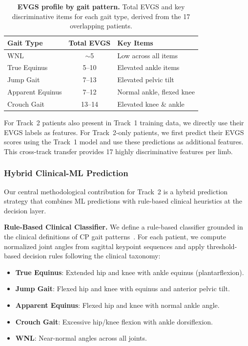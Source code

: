 \begin{table}[t]
    \centering
    \small
    \caption{\textbf{EVGS profile by gait pattern.} Total EVGS and key discriminative items for each gait type, derived from the 17 overlapping patients.}
    \label{tab:evgs_gait}
    \begin{tabular}{lcl}
        \toprule
        Gait Type & Total EVGS & Key Items \\
        \midrule
        WNL & $\sim$5 & Low across all items \\
        True Equinus & 5--10 & Elevated ankle items \\
        Jump Gait & 7--13 & Elevated pelvic tilt \\
        Apparent Equinus & 7--12 & Normal ankle, flexed knee \\
        Crouch Gait & 13--14 & Elevated knee \& ankle \\
        \bottomrule
    \end{tabular}
\end{table}

For Track~2 patients also present in Track~1 training data, we directly use their EVGS labels as features. For Track~2-only patients, we first predict their EVGS scores using the Track~1 model and use these predictions as additional features. This cross-track transfer provides 17 highly discriminative features per limb.

\subsubsection{Hybrid Clinical-ML Prediction}
\label{sec:hybrid}

Our central methodological contribution for Track~2 is a hybrid prediction strategy that combines ML predictions with rule-based clinical heuristics at the decision layer.

\noindent\textbf{Rule-Based Clinical Classifier.}
We define a rule-based classifier grounded in the clinical definitions of CP gait patterns~\cite{rodda2004classification}. For each patient, we compute normalized joint angles from sagittal keypoint sequences and apply threshold-based decision rules following the clinical taxonomy:
\begin{itemize}[leftmargin=*,nosep]
    \item \textbf{True Equinus}: Extended hip and knee with ankle equinus (plantarflexion).
    \item \textbf{Jump Gait}: Flexed hip and knee with equinus and anterior pelvic tilt.
    \item \textbf{Apparent Equinus}: Flexed hip and knee with normal ankle angle.
    \item \textbf{Crouch Gait}: Excessive hip/knee flexion with ankle dorsiflexion.
    \item \textbf{WNL}: Near-normal angles across all joints.
\end{itemize}

